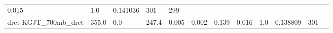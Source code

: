 \documentclass[11pt]{article}
\begin{document}
\begin{longtable}[]{@{}llllllllllll@{}}
\begin{minipage}[t]{0.04\columnwidth}
0.015\strut
\end{minipage} & \begin{minipage}[t]{0.05\columnwidth}\raggedright\strut
1.0\strut
\end{minipage} & \begin{minipage}[t]{0.05\columnwidth}\raggedright\strut
0.141036\strut
\end{minipage} & \begin{minipage}[t]{0.05\columnwidth}\raggedright\strut
301\strut
\end{minipage} & \begin{minipage}[t]{0.07\columnwidth}\raggedright\strut
299\strut
\end{minipage}\tabularnewline
\begin{minipage}[t]{0.18\columnwidth}\raggedright\strut
drct KGJT\_700mb\_drct\strut
\end{minipage} & \begin{minipage}[t]{0.04\columnwidth}\raggedright\strut
355.0\strut
\end{minipage} & \begin{minipage}[t]{0.04\columnwidth}\raggedright\strut
0.0\strut
\end{minipage} & \begin{minipage}[t]{0.04\columnwidth}\raggedright\strut
247.4\strut
\end{minipage} & \begin{minipage}[t]{0.04\columnwidth}\raggedright\strut
0.005\strut
\end{minipage} & \begin{minipage}[t]{0.05\columnwidth}\raggedright\strut
0.002\strut
\end{minipage} & \begin{minipage}[t]{0.04\columnwidth}\raggedright\strut
0.139\strut
\end{minipage} & \begin{minipage}[t]{0.04\columnwidth}\raggedright\strut
0.016\strut
\end{minipage} & \begin{minipage}[t]{0.05\columnwidth}\raggedright\strut
1.0\strut
\end{minipage} & \begin{minipage}[t]{0.05\columnwidth}\raggedright\strut
0.138809\strut
\end{minipage} & \begin{minipage}[t]{0.05\columnwidth}\raggedright\strut
301\strut
\end{minipage} & \begin{minipage}[t]{0.07\columnwidth}\raggedright\strut

\end{minipage}
\end{longtable}
\end{document}
